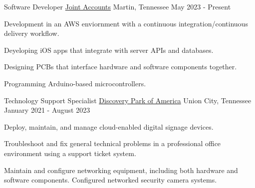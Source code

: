 
\begin{cventries}


  \cventry
    {Software Developer}
    {\href{https://www.jointaccounts.com}{Joint Accounts}}
    {Martin, Tennessee}
    {May 2023 - Present}
    {
		\begin{cvitems}
      		\item Development in an AWS enviornment with a continuous integration/continuous delivery workflow.
      		\item Deyeloping iOS apps that integrate with server APIs and databases.
      		\item Designing PCBs that interface hardware and software components together.
      		\item Programming Arduino-based microcontrollers. 
		\end{cvitems}
   	}


  \cventry
    {Technology Support Specialist}
    {\href{https://discoveryparkofamerica.com/}{Discovery Park of America}}
    {Union City, Tennessee}
    {January 2021 - August 2023}
    {
      \begin{cvitems}
        \item Deploy, maintain, and manage cloud-enabled digital signage devices.
        \item Troubleshoot and fix general technical problems in a professional office environment using a support ticket system.
        \item Maintain and configure networking equipment, including both hardware and software components. Configured networked security camera systems.
      \end{cvitems}
    }

\end{cventries}
